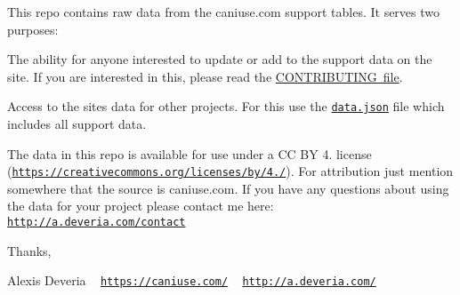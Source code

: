 

This repo contains raw data from the caniuse.\+com support tables. It serves two purposes\+:


\begin{DoxyEnumerate}
\item The ability for anyone interested to update or add to the support data on the site. If you are interested in this, please read the \mbox{\hyperlink{readable-stream_2_c_o_n_t_r_i_b_u_t_i_n_g_8md}{C\+O\+N\+T\+R\+I\+B\+U\+T\+I\+NG file}}.
\item Access to the site\textquotesingle{}s data for other projects. For this use the \href{data.json}{\tt {\ttfamily data.\+json}} file which includes all support data.
\end{DoxyEnumerate}

The data in this repo is available for use under a CC BY 4. license (\href{https://creativecommons.org/licenses/by/4.0/}{\tt https\+://creativecommons.\+org/licenses/by/4./}). For attribution just mention somewhere that the source is caniuse.\+com. If you have any questions about using the data for your project please contact me here\+: \href{http://a.deveria.com/contact}{\tt http\+://a.\+deveria.\+com/contact}

Thanks,

Alexis Deveria ~\newline
\href{https://caniuse.com/}{\tt https\+://caniuse.\+com/} ~\newline
\href{http://a.deveria.com/}{\tt http\+://a.\+deveria.\+com/} 